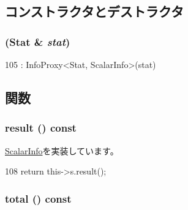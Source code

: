 \subsection{コンストラクタとデストラクタ}
\hypertarget{classStats_1_1ScalarInfoProxy_a39ef59666de4af87e1c0d348150af616}{
\subsubsection[{ScalarInfoProxy}]{ (Stat \& {\em stat})}}
\label{classStats_1_1ScalarInfoProxy_a39ef59666de4af87e1c0d348150af616}



\begin{DoxyCode}
105 : InfoProxy<Stat, ScalarInfo>(stat) {}
\end{DoxyCode}


\subsection{関数}
\hypertarget{classStats_1_1ScalarInfoProxy_ae050da86c3d8e8a677a0bdeb7971e1e3}{
\subsubsection[{result}]{ result () const}}
\label{classStats_1_1ScalarInfoProxy_ae050da86c3d8e8a677a0bdeb7971e1e3}


\hyperlink{classStats_1_1ScalarInfo_a8c2a750792392eea5225b05b9ec4bead}{ScalarInfo}を実装しています。


\begin{DoxyCode}
108 { return this->s.result(); }
\end{DoxyCode}
\hypertarget{classStats_1_1ScalarInfoProxy_a35c6e2ed3fc81b40d69052a062113ead}{
\subsubsection[{total}]{ total () const}}
\label{classStats_1_1ScalarInfoProxy_a35c6e2ed3fc81b40d69052a062113ead}


